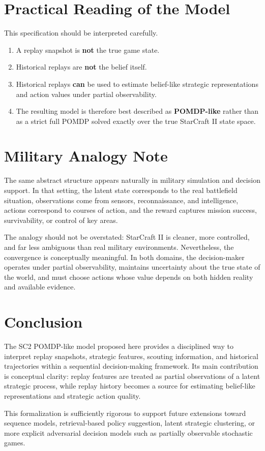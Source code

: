 \documentclass[11pt,a4paper]{article}
\begin{document}
\section{Practical Reading of the Model}
This specification should be interpreted carefully.
\begin{enumerate}[leftmargin=1.8em]
    \item A replay snapshot is \textbf{not} the true game state.
    \item Historical replays are \textbf{not} the belief itself.
    \item Historical replays \textbf{can} be used to estimate belief-like strategic representations and action values under partial observability.
    \item The resulting model is therefore best described as \textbf{POMDP-like} rather than as a strict full POMDP solved exactly over the true StarCraft II state space.
\end{enumerate}

\section{Military Analogy Note}
The same abstract structure appears naturally in military simulation and decision support. In that setting, the latent state corresponds to the real battlefield situation, observations come from sensors, reconnaissance, and intelligence, actions correspond to courses of action, and the reward captures mission success, survivability, or control of key areas.

The analogy should not be overstated: StarCraft II is cleaner, more controlled, and far less ambiguous than real military environments. Nevertheless, the convergence is conceptually meaningful. In both domains, the decision-maker operates under partial observability, maintains uncertainty about the true state of the world, and must choose actions whose value depends on both hidden reality and available evidence.

\section{Conclusion}
The SC2 POMDP-like model proposed here provides a disciplined way to interpret replay snapshots, strategic features, scouting information, and historical trajectories within a sequential decision-making framework. Its main contribution is conceptual clarity: replay features are treated as partial observations of a latent strategic process, while replay history becomes a source for estimating belief-like representations and strategic action quality.

This formalization is sufficiently rigorous to support future extensions toward sequence models, retrieval-based policy suggestion, latent strategic clustering, or more explicit adversarial decision models such as partially observable stochastic games.
\end{document}
